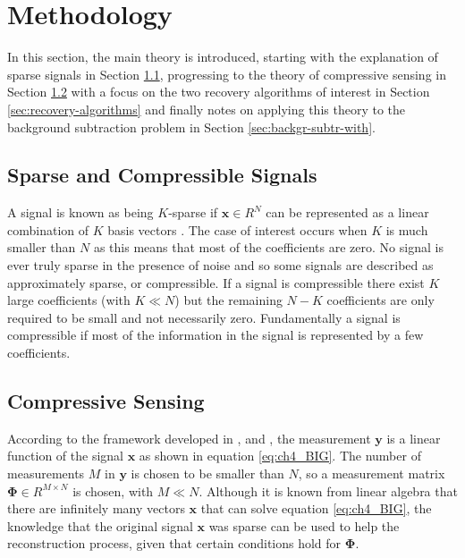 \section{Methodology}
\label{sec:background}

In this section, the main theory is introduced, starting with the explanation of sparse signals in Section \ref{sec:compressible-signals}, progressing to the theory of compressive sensing in Section \ref{sec:compressive-sensing} with a focus on the two recovery algorithms of interest in Section \ref{sec:recovery-algorithms} and finally notes on applying this theory to the background subtraction problem in Section \ref{sec:backgr-subtr-with}.

\subsection{Sparse and Compressible Signals}

\label{sec:compressible-signals}
A signal is known as being $K$-sparse if $\boldsymbol{x} \in R^N$ can be represented as a linear combination of $K$ basis vectors \citep{Baraniuk2007}. The case of interest occurs when $K$ is much smaller than $N$ as this means that most of the coefficients are zero. No signal is ever truly sparse in the presence of noise and so some signals are described as approximately sparse, or compressible. If a signal is compressible there exist $K$ large coefficients (with $K \ll N$) but the remaining $N-K$ coefficients are only required to be small and not necessarily zero. Fundamentally a signal is compressible if most of the information in the signal is represented by a few coefficients.

\subsection{Compressive Sensing}
\label{sec:compressive-sensing}

According to the framework developed in \cite{Candes2006},  \cite{Candes2006a} and \cite{Donoho2006}, the measurement $\boldsymbol{y}$ is a linear function of the signal $\boldsymbol{x}$ as shown in equation \eqref{eq:ch4_BIG}. The number of measurements $M$ in $\boldsymbol{y}$ is chosen to be smaller than $N$, so a measurement matrix $\boldsymbol{\Phi} \in R^{M \times N}$ is chosen, with $M \ll N$. Although it is known from linear algebra that there are infinitely many vectors $\boldsymbol{x}$ that can solve equation \eqref{eq:ch4_BIG}, the knowledge that the original signal $\boldsymbol{x}$ was sparse can be used to help the reconstruction process, given that certain conditions hold for $\boldsymbol{\Phi}$. 

